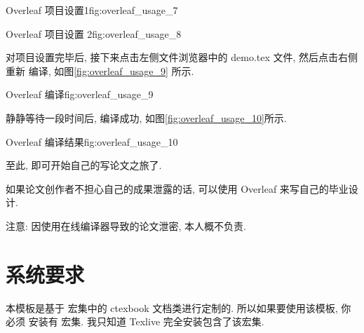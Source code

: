 \documentclass[bibsec, doctor]{cugthesis}
\begin{document}
\begin{tfig}{Overleaf   项目设置1}{fig:overleaf_usage_7}
\end{tfig}

\begin{tfig}{Overleaf  项目设置 2}{fig:overleaf_usage_8}
\end{tfig}

对项目设置完毕后, 接下来点击左侧文件浏览器中的 demo.tex 文件, 然后点击右侧重新
编译, 如图\ref{fig:overleaf_usage_9} 所示.

\begin{tfig}{Overleaf   编译}{fig:overleaf_usage_9}
\end{tfig}

静静等待一段时间后, 编译成功, 如图\ref{fig:overleaf_usage_10}所示.

\begin{tfig}{Overleaf   编译结果}{fig:overleaf_usage_10}
\end{tfig}

至此, 即可开始自己的写论文之旅了.

如果论文创作者不担心自己的成果泄露的话, 可以使用 Overleaf 来写自己的毕业设计.

注意: 因使用在线编译器导致的论文泄密, 本人概不负责.

\section{系统要求}
\label{sec:xi_tong_yao_qiu_}
本模板是基于 \CTeX{} 宏集中的 ctexbook 文档类进行定制的. 所以如果要使用该模板, 你必须
安装有 \CTeX{} 宏集. 我只知道 Texlive 完全安装包含了该宏集.
\end{document}
